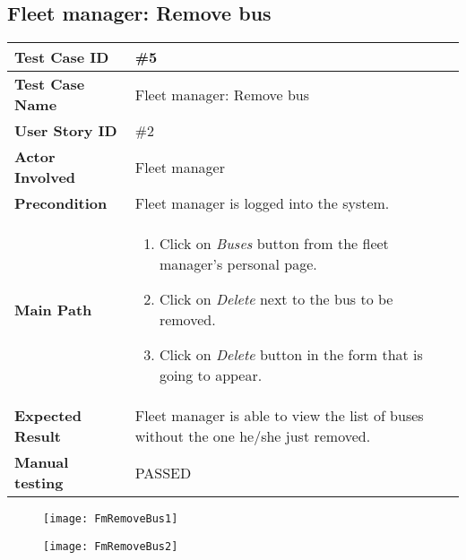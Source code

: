 \subsection{Fleet manager: Remove bus}
\begin{center}
	\begin{tabular} { | m{3.5cm} | m{9.5cm} | }
		\hline
		\textbf{Test Case ID} & \#5\\
		\hline
		\textbf{Test Case Name} & Fleet manager: Remove bus\\
		\hline
		\textbf{User Story ID} & \#2 \\
		\hline
		\textbf{Actor Involved} & Fleet manager\\
		\hline
		\textbf{Precondition} & Fleet manager is logged into the system.\\
		\hline
		\textbf{Main Path} & 
		\begin{enumerate}
			\item Click on \textit{Buses} button from the fleet manager's personal page.
			\item Click on \textit{Delete} next to the bus to be removed.
			\item Click on \textit{Delete} button in the form that is going to appear.
		\end{enumerate}\\
		\hline
		\textbf{Expected Result} & Fleet manager is able to view the list of buses without the one he/she just removed.\\
		\hline
	\textbf{Manual testing} & PASSED\\
	\hline
\end{tabular}
\end{center}
\begin{figure}[H]
\centering
\texttt{[image: FmRemoveBus1]}
\end{figure}
\begin{figure}[H]
\centering
\texttt{[image: FmRemoveBus2]}
\end{figure}
\newpage
